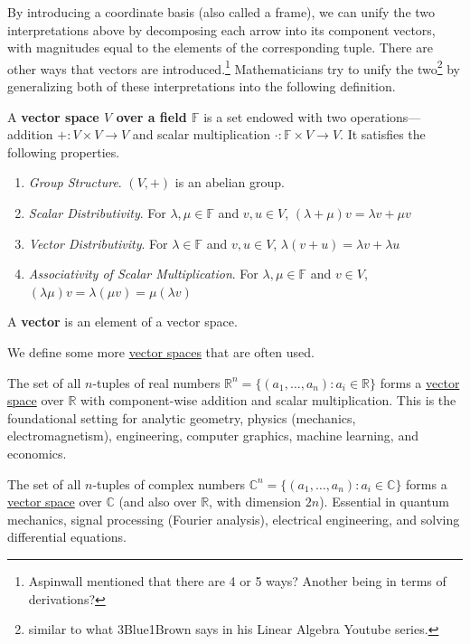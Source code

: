   By introducing a coordinate basis (also called a frame), we can unify the two interpretations above by decomposing each arrow into its component vectors, with magnitudes equal to the elements of the corresponding tuple. There are other ways that vectors are introduced.\footnote{Aspinwall mentioned that there are 4 or 5 ways? Another being in terms of derivations?} Mathematicians try to unify the two\footnote{similar to what 3Blue1Brown says in his Linear Algebra Youtube series.} by generalizing both of these interpretations into the following definition. 

  \begin{definition}
    \label{def:vector-space}
    A \textbf{vector space $V$ over a field $\mathbb{F}$} is a set endowed with two operations---addition $+: V \times V \to V$ and scalar multiplication $\cdot: \mathbb{F} \times V \to V$. It satisfies the following properties. 
    \begin{enumerate}
      \item \textit{Group Structure}. $(V, +)$ is an abelian group. 
      \item \textit{Scalar Distributivity}. For $\lambda, \mu \in \mathbb{F}$ and $v, u \in V$, $(\lambda + \mu) v = \lambda v + \mu v$
      \item \textit{Vector Distributivity}. For $\lambda \in \mathbb{F}$ and $v, u \in V$, $\lambda (v + u) = \lambda v + \lambda u$
      \item \textit{Associativity of Scalar Multiplication}. For $\lambda, \mu \in \mathbb{F}$ and $v \in V$, $(\lambda \mu) v = \lambda (\mu v) = \mu (\lambda v)$ 
    \end{enumerate}
    A \textbf{vector} is an element of a vector space.
  \end{definition} 

  We define some more \hyperref[def:vector-space]{vector spaces} that are often used. 

  \begin{example}[$\mathbb{R}^n$]
    \label{ex:rn}
    The set of all $n$-tuples of real numbers $\mathbb{R}^n = \{(a_1, \dots, a_n) : a_i \in \mathbb{R}\}$ forms a \hyperref[def:vector-space]{vector space} over $\mathbb{R}$ with component-wise addition and scalar multiplication. This is the foundational setting for analytic geometry, physics (mechanics, electromagnetism), engineering, computer graphics, machine learning, and economics.
  \end{example}

  \begin{example}[$\mathbb{C}^n$]
    \label{ex:cn}
    The set of all $n$-tuples of complex numbers $\mathbb{C}^n = \{(a_1, \dots, a_n) : a_i \in \mathbb{C}\}$ forms a \hyperref[def:vector-space]{vector space} over $\mathbb{C}$ (and also over $\mathbb{R}$, with dimension $2n$). Essential in quantum mechanics, signal processing (Fourier analysis), electrical engineering, and solving differential equations.
  \end{example}

